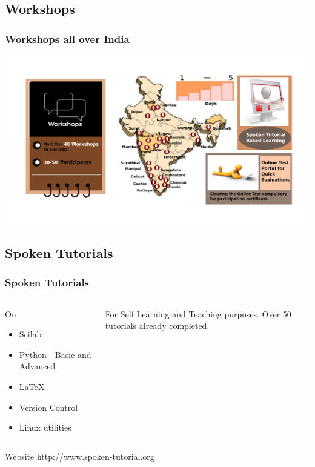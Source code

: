\documentclass[compress,red]{beamer} %
\begin{document}
\subsection{Workshops}
\begin{frame}
\frametitle{Workshops all over India}
\begin{center}
\includegraphics[scale=.15]{workshop.png}
\end{center}
\end{frame}

\subsection{Spoken Tutorials}
\begin{frame}
\frametitle{Spoken Tutorials}
\begin{columns}
\begin{block}{On}
\begin{itemize}
\item Scilab
\item Python - Basic and Advanced
\item \LaTeX
\item Version Control
\item Linux utilities
\end{itemize}
\end{block}
\begin{block}{For}
Self Learning and Teaching purposes.
Over \alert{50} tutorials already completed.
\end{block}
\pause
\end{columns}
\begin{block}{Website}
http://www.spoken-tutorial.org
\end{block}
\end{frame}
\end{document}
